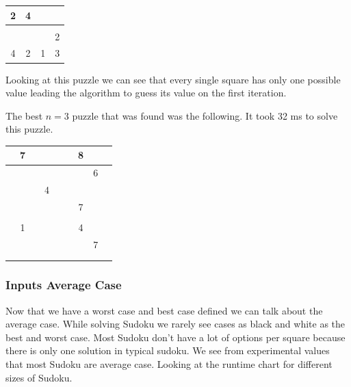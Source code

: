 \documentclass{sig-alternate}
\begin{document}
\begin{center}
  \begin{tabular}{ | c | c | c | c | }
    \hline
		2 & 4 &  & \\ \hline
         &  &  &  \\ \hline
         &  &  & 2\\ \hline
        4 & 2 & 1 & 3 \\
    \hline
  \end{tabular}
\end{center}

Looking at this puzzle we can see that every single square has only one possible value leading the algorithm to guess its value on the first iteration. 

The best $n=3$ puzzle that was found was the following. It took 32 ms to solve this puzzle. 

\begin{center}
  \begin{tabular}{ | c | c | c | c | c | c | c | c | c |}
    \hline
    	 & 7 &  &  &  &  & 8 &  &  \\ \hline
         &  &  &  &  &  &  & 6 &  \\ \hline
         &  &  & 4 &  &  &  &  &  \\ \hline
   		 &  &  &  &  &  & 7 &  &  \\ \hline
         &  &  &  &  &  &  &  &  \\ \hline
         & 1 & &  &  &  & 4 &  &  \\ \hline
      	 &  &  &  &  &  &  & 7 &  \\ \hline
         &  &  &  &  &  &  &  &  \\ \hline
         &  &  &  &  &  &  &  &  \\ 
    \hline
  \end{tabular}
\end{center}

\subsubsection{Inputs Average Case}
Now that we have a worst case and best case defined we can talk about the average case. While solving Sudoku we rarely see cases as black and white as the best and worst case. Most Sudoku don't have a lot of options per square because there is only one solution in typical sudoku. We see from experimental values that most Sudoku are average case. Looking at the runtime chart for different sizes of Sudoku. 
\end{document}
